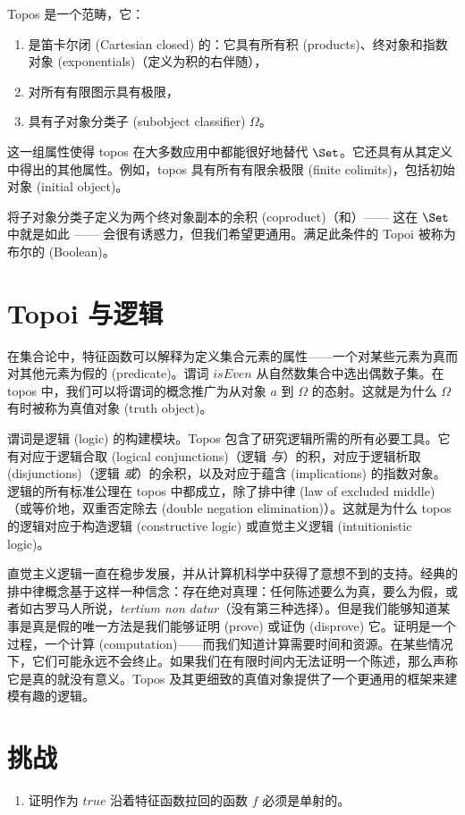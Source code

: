 Topos 是一个范畴，它：

\begin{enumerate}
  \tightlist
  \item
        是笛卡尔闭 (Cartesian closed) 的：它具有所有积 (products)、终对象和指数对象 (exponentials)（定义为积的右伴随），
  \item
        对所有有限图示具有极限，
  \item
        具有子对象分类子 (subobject classifier) $\Omega$。
\end{enumerate}

这一组属性使得 topos 在大多数应用中都能很好地替代 $\Set$。它还具有从其定义中得出的其他属性。例如，topos 具有所有有限余极限 (finite colimits)，包括初始对象 (initial object)。

将子对象分类子定义为两个终对象副本的余积 (coproduct)（和）—— 这在 $\Set$ 中就是如此 —— 会很有诱惑力，但我们希望更通用。满足此条件的 Topoi 被称为布尔的 (Boolean)。

\section{Topoi 与逻辑}

在集合论中，特征函数可以解释为定义集合元素的属性——一个对某些元素为真而对其他元素为假的  (predicate)。谓词 $\mathit{isEven}$ 从自然数集合中选出偶数子集。在 topos 中，我们可以将谓词的概念推广为从对象 $a$ 到 $\Omega$ 的态射。这就是为什么 $\Omega$ 有时被称为真值对象 (truth object)。

谓词是逻辑 (logic) 的构建模块。Topos 包含了研究逻辑所需的所有必要工具。它有对应于逻辑合取 (logical conjunctions)（逻辑 \emph{与}）的积，对应于逻辑析取 (disjunctions)（逻辑 \emph{或}）的余积，以及对应于蕴含 (implications) 的指数对象。逻辑的所有标准公理在 topos 中都成立，除了排中律 (law of excluded middle)（或等价地，双重否定除去 (double negation elimination)）。这就是为什么 topos 的逻辑对应于构造逻辑 (constructive logic) 或直觉主义逻辑 (intuitionistic logic)。

直觉主义逻辑一直在稳步发展，并从计算机科学中获得了意想不到的支持。经典的排中律概念基于这样一种信念：存在绝对真理：任何陈述要么为真，要么为假，或者如古罗马人所说，\emph{tertium non datur}（没有第三种选择）。但是我们能够知道某事是真是假的唯一方法是我们能够证明 (prove) 或证伪 (disprove) 它。证明是一个过程，一个计算 (computation)——而我们知道计算需要时间和资源。在某些情况下，它们可能永远不会终止。如果我们在有限时间内无法证明一个陈述，那么声称它是真的就没有意义。Topos 及其更细致的真值对象提供了一个更通用的框架来建模有趣的逻辑。

\section{挑战}

\begin{enumerate}
  \tightlist
  \item
        证明作为 $\mathit{true}$ 沿着特征函数拉回的函数 $f$ 必须是单射的。
\end{enumerate}